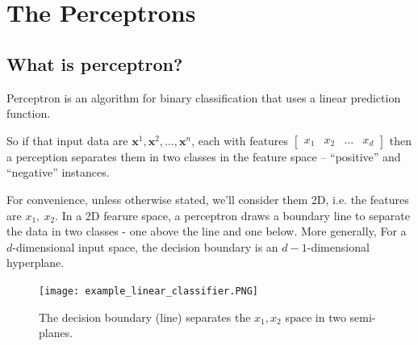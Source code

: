 \documentclass[a4paper]{article}
\begin{document}






\newpage
\tableofcontents
\newpage



\section{The Perceptrons}

\subsection{What is perceptron?}

\begin{definition}
Perceptron is an algorithm for binary classification that uses a linear prediction function.
\end{definition}
So if that input data are $\textbf{x}^1, \textbf{x}^2, \ldots , \textbf{x}^n$, each with features $\begin{bmatrix} x_1 & x_2 & \ldots & x_d\end{bmatrix}$ then a perception separates them in two classes in the feature space -- ``positive'' and ``negative'' instances.

For convenience, unless otherwise stated, we'll consider them 2D, i.e. the features are $x_1,\ x_2$. In  a 2D fearure space, a perceptron draws a boundary line to separate the data in two classes - one above the line and one below. More generally, For a $d$-dimensional input space, the decision boundary is an $d-1$-dimensional hyperplane.
\begin{figure}[H]
    \centering
    \texttt{[image: example\_linear\_classifier.PNG]}
    \caption{The decision boundary (line) separates the $x_1,x_2$ space in two semi-planes.}
\end{figure}
\end{document}
